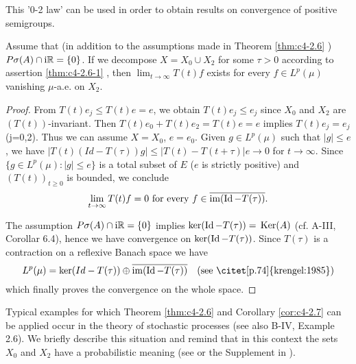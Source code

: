 This '0-2 law' can be used in order to obtain results on convergence of positive semigroups.

\begin{corollary}\label{cor:c4-2.7}
Assume that (in addition to the assumptions made in Theorem \ref{thm:c4-2.6} ) $P{\sigma}(A) \cap \mathrm{i}\mathbb{R} = \{0\}$.
If we decompose $X = X_{0} \cup X_{2}$ for some $\tau > 0$ according to assertion \ref{thm:c4-2.6-1} , then $\lim_{t \to \infty} T(t)f$ exists for every $f \in L^{p}(\mu)$ vanishing $\mu$-a.e. on $X_{2}$.
\end{corollary}

\begin{proof}
From $T(t)e_{j} \leq T(t)e = e$, we obtain $T(t)e_{j} \leq e_{j}$ since $X_{0}$ and $X_{2}$ are $(T(t))$-invariant.
Then $T(t)e_{0} + T(t)e_{2} = T(t)e = e$ implies $T(t)e_{j} = e_{j}$ (j=0,2).
Thus we can assume $X = X_{0}$, $e = e_{0}$.
Given $g \in L^{p}(\mu)$ such that $|g| \leq e$, we have
$|T(t)(Id - T(\tau))g| \leq |T(t) - T(t+\tau)|e \to 0$ for $t \to \infty$.
Since $\{g \in L^{p}(\mu) : |g| \leq e\}$ is a total subset of $E$ ($e$ is strictly positive) and $(T(t))_{t \geq 0}$ is bounded, we conclude
\begin{equation}\label{eq:c4-2.6}
\lim_{t \to \infty} T(t)f = 0 \text{ for every } f \in \overline{\text{im}(\operatorname{Id} - T(\tau))}.
\end{equation}

The assumption $P{\sigma}(A) \cap \mathrm{i}\mathbb{R} = \{0\}$ implies $\ker(\operatorname{Id} - T(\tau)) = \mathop{}\mathrm{Ker}(A)$ (cf. A-III, Corollar 6.4), hence we have convergence on $\ker(\operatorname{Id} -T(\tau))$.
Since $T(\tau)$ is a contraction on a reflexive Banach space we have
\[
L^{p}(\mu) = \ker(Id - T(\tau)) \oplus \overline{\text{im}(\Id - T(\tau))} \quad \text{(see \citet [p.74]{krengel:1985})}
\]  
which finally proves the convergence on the whole space.
\end{proof}

Typical examples for which Theorem \ref{thm:c4-2.6} and Corollary \ref{cor:c4-2.7}  can be applied occur in the theory of stochastic processes (see also B-IV, Example 2.6).
We briefly describe this situation and remind that in this context the sets $X_{0}$ and $X_{2}$ have a probabilistic meaning (see \citet{greinernagel:1982} or the Supplement in \citet{krengel:1985}).

